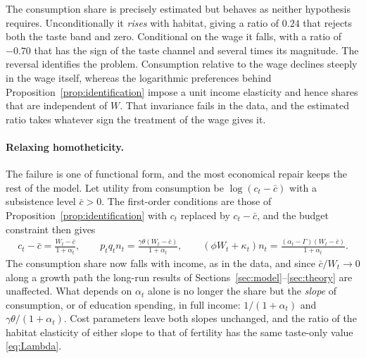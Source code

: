\documentclass[11pt]{article}
\begin{document}
The consumption share is precisely estimated but behaves as neither hypothesis requires.
Unconditionally it \emph{rises} with habitat, giving a ratio of $0.24$ that rejects both the taste
band and zero. Conditional on the wage it falls, with a ratio of $-0.70$ that has the sign of the
taste channel and several times its magnitude. The reversal identifies the problem. Consumption
relative to the wage declines steeply in the wage itself, whereas the logarithmic preferences
behind Proposition~\ref{prop:identification} impose a unit income elasticity and hence shares that
are independent of $W$. That invariance fails in the data, and the estimated ratio takes whatever
sign the treatment of the wage gives it.

\paragraph{Relaxing homotheticity.}
The failure is one of functional form, and the most economical repair keeps the rest of the model.
Let utility from consumption be $\log(c_t-\bar c)$ with a subsistence level $\bar c>0$. The
first-order conditions are those of Proposition~\ref{prop:identification} with $c_t$ replaced by
$c_t-\bar c$, and the budget constraint then gives
\begin{align}
c_t-\bar c=\frac{W_t-\bar c}{1+\alpha_t},
\qquad
p_tq_tn_t=\frac{\gamma\theta\left(W_t-\bar c\right)}{1+\alpha_t},
\qquad
\left(\phi W_t+\kappa_t\right)n_t=\frac{\left(\alpha_t-\Gamma\right)\left(W_t-\bar c\right)}{1+\alpha_t}.
\label{eq:stone_geary}
\end{align}
The consumption share now falls with income, as in the data, and since $\bar c/W_t\to0$ along a
growth path the long-run results of Sections~\ref{sec:model}--\ref{sec:theory} are
unaffected. What depends on $\alpha_t$ alone is no longer the share but the \emph{slope} of
consumption, or of education spending, in full income: $1/(1+\alpha_t)$ and
$\gamma\theta/(1+\alpha_t)$. Cost parameters leave both slopes unchanged, and the ratio of the
habitat elasticity of either slope to that of fertility has the same taste-only value
\eqref{eq:Lambda}.
\end{document}
